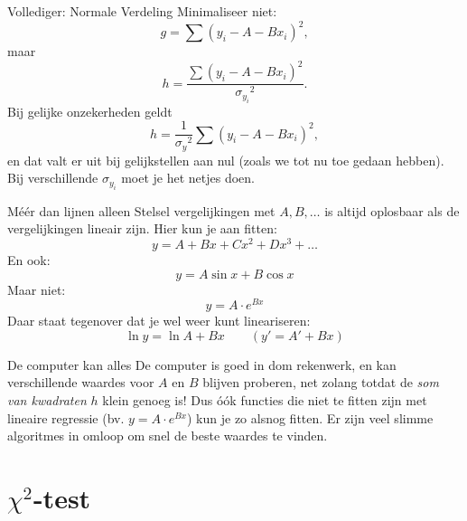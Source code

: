 \documentclass{beamer}
\begin{document}
\begin{frame}{Vollediger: Normale Verdeling}
  Minimaliseer \alert{niet}:
  \begin{equation*}
    g = \sum(y_i - A - Bx_i)^2,
  \end{equation*}
  maar
  \begin{equation*}
    h = \frac{\sum(y_i - A - Bx_i)^2}{{\sigma_{y_i}}^2}.
  \end{equation*}
  Bij gelijke onzekerheden geldt
  \begin{equation*}
    h = \frac{1}{{\sigma_y}^2}\sum(y_i - A - Bx_i)^2,
  \end{equation*}
  en dat valt er uit bij gelijkstellen aan nul (zoals we tot nu toe gedaan hebben). Bij verschillende $\sigma_{y_i}$ moet je het netjes doen.
\end{frame}

\begin{frame}{Méér dan lijnen alleen}
  Stelsel vergelijkingen met $A, B, \ldots$ is altijd oplosbaar als de vergelijkingen \alert{lineair} zijn. Hier kun je aan fitten:
  \begin{equation*}
    y = A + Bx + Cx^2 + Dx^3 + \ldots
  \end{equation*}
  \pause
  En ook:
  \begin{equation*}
    y = A\sin x + B\cos x
  \end{equation*}
  \pause
  Maar niet:
  \begin{equation*}
    y = A\cdot e^{Bx}
  \end{equation*}
  \pause
  Daar staat tegenover dat je wel weer kunt \alert{lineariseren}:
  \begin{equation*}
    \ln y = \ln A + Bx  \qquad (y' = A' + Bx)
  \end{equation*}
\end{frame}

\begin{frame}{De computer kan alles}
  De computer is goed in dom rekenwerk, en kan verschillende waardes voor $A$ en $B$ blijven proberen, net zolang totdat de \emph{som van kwadraten} $h$ klein genoeg is! Dus óók functies die niet te fitten zijn met lineaire regressie (bv. $y = A\cdot e^{Bx}$) kun je zo alsnog fitten. Er zijn veel slimme algoritmes in omloop om snel de beste waardes te vinden.
\end{frame}


\section{$\chi^2$-test}
\end{document}
